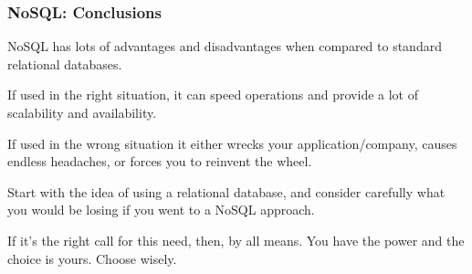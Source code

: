 \begin{frame}
\frametitle{NoSQL: Conclusions}

NoSQL has lots of advantages and disadvantages when compared to standard relational databases. 

If used in the right situation, it can speed operations and provide a lot of scalability and availability.

 If used in the wrong situation it either wrecks your application/company, causes endless headaches, or forces you to reinvent the wheel.
 
 Start with the idea of using a relational database, and consider carefully what you would be losing if you went to a NoSQL approach.
 
  If it's the right call for this need, then, by all means. You have the power and the choice is yours. Choose wisely.


\end{frame}






